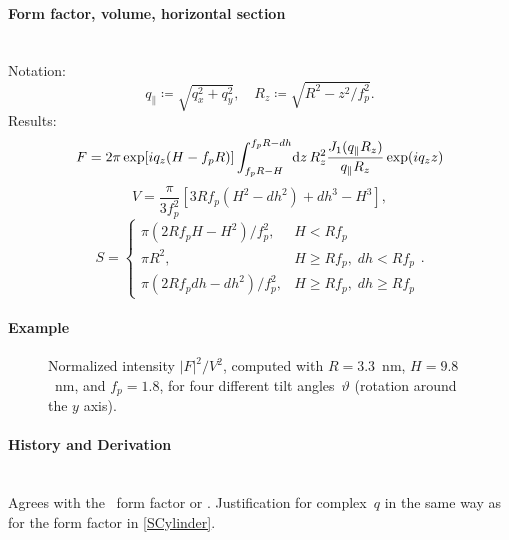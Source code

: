 \paragraph{Form factor, volume, horizontal section}\strut\\
Notation:
\begin{equation*}
  q_{\parallel} \coloneqq \sqrt{q_x^2+q_y^2}, \quad
  R_z \coloneqq \sqrt{R^2-z^2/f_p^2}.
\end{equation*}
Results:
\begin{equation*}
F =   2\pi \exp[iq_z(H-f_pR)] \int_{f_p R-H}^{f_p R-dh} \!\mathrm d z\,
     R_z^2\frac{J_1(q_{\parallel}R_z)}{q_{\parallel}R_z} \exp(i q_z z)
\end{equation*}
\begin{equation*}
  V=\frac{\pi}{3f_p^2} \left[ 3R f_p\left(H^2-dh^2\right) +dh^3 - H^3 \right],
\end{equation*}
\begin{equation*}
  S = \left\{\begin{array}{ll} \pi\left(2Rf_pH-H^2\right)/f_p^2, & H < Rf_p \\
                               \pi R^2, & H \geq Rf_p,\; dh < Rf_p \\
                               \pi\left(2Rf_pdh-dh^2\right)/f_p^2, & H \geq Rf_p,\; dh \geq Rf_p
                                 \end{array}\right..
\end{equation*}

\paragraph{Example}\strut

\begin{figure}[H]
\begin{center}
\end{center}
\caption{Normalized intensity $|F|^2/V^2$,
computed with $R=3.3$~nm, $H=9.8$~nm, and $f_p=1.8$,
for four different tilt angles~$\vartheta$ (rotation around the $y$ axis).}
\end{figure}

\paragraph{History and Derivation}\strut\\
Agrees with the \IsGISAXS\ form factor
 \cite[Eq.~2.33]{Laz06} or
 \cite[Eq.~228]{ReLL09}.
Justification for complex~$q$ in the same way as for the  form factor
in \cref{SCylinder}.

